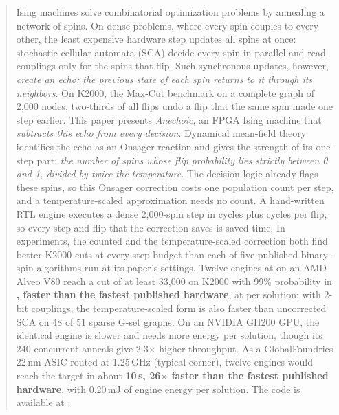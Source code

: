 \begin{abstract}
Ising machines solve combinatorial optimization problems by annealing a network of spins. On dense problems, where every spin couples to every other, the least expensive hardware step updates all spins at once: stochastic cellular automata (SCA) decide every spin in parallel and read couplings only for the spins that flip. Such synchronous updates, however, \textit{create an echo: the previous state of each spin returns to it through its neighbors}. On K2000, the Max-Cut benchmark on a complete graph of 2{,}000 nodes, two-thirds of all flips undo a flip that the same spin made one step earlier. This paper presents \emph{Anechoic}, an FPGA Ising machine that \textit{subtracts this echo from every decision}. Dynamical mean-field theory identifies the echo as an Onsager reaction and gives the strength of its one-step part: \textit{the number of spins whose flip probability lies strictly between 0 and 1, divided by twice the temperature}. The decision logic already flags these spins, so this Onsager correction costs one population count per step, and a temperature-scaled approximation needs no count. A hand-written RTL engine executes a dense 2{,}000-spin step in \cycStep{} cycles plus \cycFlip{} cycles per flip, so every step and flip that the correction saves is saved time. In experiments, the counted and the temperature-scaled correction both find better K2000 cuts at every step budget than each of five published binary-spin algorithms run at its paper's settings. Twelve engines at \fClk{} on an AMD Alveo V80 reach a cut of at least 33{,}000 on K2000 with 99\% probability in \textbf{\ttsPr{}, \spdBSB{} faster than the fastest published hardware}, at \ets{} per solution; with 2-bit couplings, the temperature-scaled form is also faster than uncorrected SCA on 48 of 51 sparse G-set graphs. On an NVIDIA GH200 GPU, the identical engine is \gpuSpd{} slower and needs \gpuEratio{} more energy per solution, though its 240 concurrent anneals give 2.3$\times$ higher throughput. As a GlobalFoundries 22\,nm ASIC routed at 1.25\,GHz (typical corner), twelve engines would reach the target in about \textbf{10\,\textmu s, 26$\times$ faster than the fastest published hardware}, with 0.20\,mJ of engine energy per solution. The code is available at \coderepo{}.
\end{abstract}

